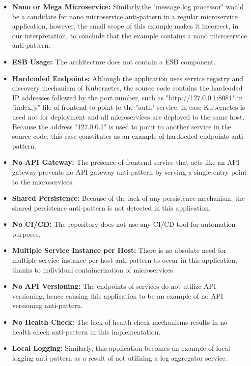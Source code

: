 \documentclass{Configuration_Files/PoliMi3i_thesis}
\begin{document}
\begin{itemize}
    \item \textbf{Nano or Mega Microservice:} Similarly,the "message log processor" would be a candidate for nano microservice anti-pattern in a regular microservice application, however, the small scope of this example makes it incorrect, in our interpretation, to conclude that the example contains a nano microservice anti-pattern.
    
    \item \textbf{ESB Usage:} The architecture does not contain a ESB component.
    
    \item \textbf{Hardcoded Endpoints:} Although the application uses service registry and discovery mechanism of Kubernetes, the source code contains the hardcoded IP addresses followed by the port number, such as "http://127.0.0.1:8081" in "index.js" file of frontend to point to the "auth" service, in case Kubernetes is used not for deployment and all microservices are deployed to the same host.
    Because the address "127.0.0.1" is used to point to another service in the source code, this case constitutes as an example of hardocded endpoints anti-pattern.
    
    \item \textbf{No API Gateway:} The presence of frontend service that acts like an API gateway prevents no API gateway anti-pattern by serving a single entry point to the microservices.
    
    \item \textbf{Shared Persistence:} Because of the lack of any persistence mechanism, the shared persistence anti-pattern is not detected in this application.
    
    \item \textbf{No CI/CD:} The repository does not use any CI/CD tool for automation purposes.
    
    \item \textbf{Multiple Service Instance per Host:} There is no absolute need for multiple service instance per host anti-pattern to occur in this application, thanks to individual containerization of microservices.
    
    \item \textbf{No API Versioning:} The endpoints of services do not utilize API versioning, hence causing this application to be an example of no API versioning anti-pattern.
    
    \item \textbf{No Health Check:} The lack of health check mechanisms results in no health check anti-pattern in this implementation.
    
    \item \textbf{Local Logging:} Similarly, this application becomes an example of local logging anti-pattern as a result of not utilizing a log aggregator service.
\end{itemize}
\end{document}
